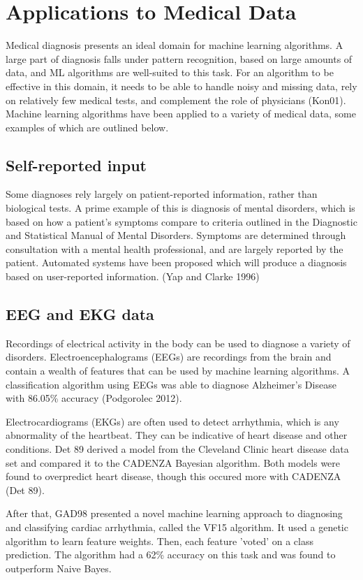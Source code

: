 \documentclass{article}
\begin{document}
\section{Applications to Medical Data}
Medical diagnosis presents an ideal domain for machine learning
algorithms. A large part of diagnosis falls under pattern recognition,
based on large amounts of data, and ML algorithms are well-suited to
this task. For an algorithm to be effective in this domain, it needs to be able to handle noisy and missing
data, rely on relatively few medical tests, and complement the role of
physicians (Kon01).
Machine learning algorithms have been applied to a variety of medical
data, some examples of which are outlined below.

\subsection{Self-reported input}
Some diagnoses rely largely on patient-reported information, rather than
biological tests. A prime example of this is diagnosis of mental disorders,
which is based on how a patient's symptoms compare to criteria
outlined in the Diagnostic and Statistical Manual of Mental
Disorders. Symptoms are determined through consultation with a mental
health professional, and are largely reported by the
patient. Automated systems
have been proposed which will produce a diagnosis based on
user-reported information. (Yap and Clarke 1996)

\subsection{EEG and EKG data}
Recordings of electrical activity in the body can be used to diagnose a variety of
disorders. Electroencephalograms (EEGs) are recordings from the brain
and contain a wealth of features that can be used by machine learning
algorithms. A classification algorithm using EEGs was able to diagnose
Alzheimer's Disease with 86.05\% accuracy (Podgorolec 2012).

Electrocardiograms (EKGs) are often used to detect arrhythmia, which is any
abnormality of the heartbeat. They can be indicative of heart disease
and other conditions.
Det 89 derived a model from the Cleveland Clinic heart disease data set and
compared it to the CADENZA Bayesian algorithm. Both models were found
to overpredict heart disease, though this occured more with CADENZA
(Det 89). 

After that, GAD98 presented a novel machine learning approach to diagnosing and classifying cardiac arrhythmia, called the VF15 algorithm. It used a genetic algorithm to learn feature weights. Then, each feature 'voted’ on a class prediction. The algorithm had a 62\% accuracy on this task and was found to outperform Naive Bayes.
\end{document}
